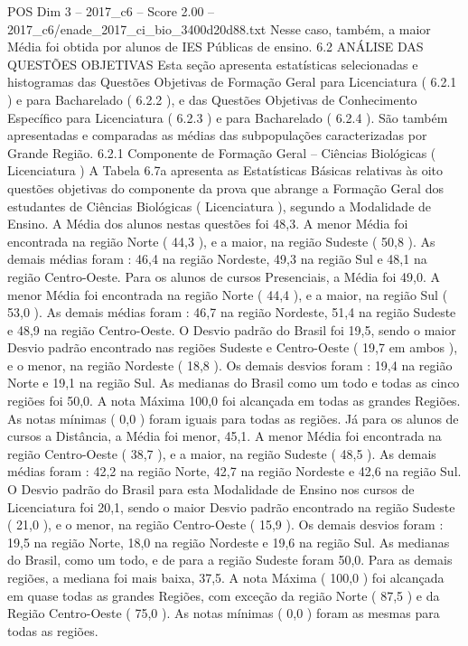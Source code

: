 \begin{textsample}{POS Dim 3 – 2017\_c6 – Score 2.00 – 2017\_c6/enade\_2017\_ci\_bio\_3400d20d88.txt}
Nesse caso, também, a maior Média foi obtida por alunos de IES Públicas de ensino. 6.2 ANÁLISE DAS QUESTÕES OBJETIVAS Esta seção apresenta estatísticas selecionadas e histogramas das Questões Objetivas de Formação Geral para Licenciatura ( 6.2.1 ) e para Bacharelado ( 6.2.2 ), e das Questões Objetivas de Conhecimento Específico para Licenciatura ( 6.2.3 ) e para Bacharelado ( 6.2.4 ).
São também apresentadas e comparadas as médias das subpopulações caracterizadas por Grande Região. 6.2.1 Componente de Formação Geral – Ciências Biológicas ( Licenciatura ) A Tabela 6.7a apresenta as Estatísticas Básicas relativas às oito questões objetivas do componente da prova que abrange a Formação Geral dos estudantes de Ciências Biológicas ( Licenciatura ), segundo a Modalidade de Ensino.
A Média dos alunos nestas questões foi 48,3.
A menor Média foi encontrada na região Norte ( 44,3 ), e a maior, na região Sudeste ( 50,8 ).
As demais médias foram : 46,4 na região Nordeste, 49,3 na região Sul e 48,1 na região Centro-Oeste.
Para os alunos de cursos Presenciais, a Média foi 49,0.
A menor Média foi encontrada na região Norte ( 44,4 ), e a maior, na região Sul ( 53,0 ).
As demais médias foram : 46,7 na região Nordeste, 51,4 na região Sudeste e 48,9 na região Centro-Oeste.
O Desvio padrão do Brasil foi 19,5, sendo o maior Desvio padrão encontrado nas regiões Sudeste e Centro-Oeste ( 19,7 em ambos ), e o menor, na região Nordeste ( 18,8 ).
Os demais desvios foram : 19,4 na região Norte e 19,1 na região Sul.
As medianas do Brasil como um todo e todas as cinco regiões foi 50,0.
A nota Máxima 100,0 foi alcançada em todas as grandes Regiões.
As notas mínimas ( 0,0 ) foram iguais para todas as regiões.
Já para os alunos de cursos a Distância, a Média foi menor, 45,1.
A menor Média foi encontrada na região Centro-Oeste ( 38,7 ), e a maior, na região Sudeste ( 48,5 ).
As demais médias foram : 42,2 na região Norte, 42,7 na região Nordeste e 42,6 na região Sul.
O Desvio padrão do Brasil para esta Modalidade de Ensino nos cursos de Licenciatura foi 20,1, sendo o maior Desvio padrão encontrado na região Sudeste ( 21,0 ), e o menor, na região Centro-Oeste ( 15,9 ).
Os demais desvios foram : 19,5 na região Norte, 18,0 na região Nordeste e 19,6 na região Sul.
As medianas do Brasil, como um todo, e de para a região Sudeste foram 50,0.
Para as demais regiões, a mediana foi mais baixa, 37,5.
A nota Máxima ( 100,0 ) foi alcançada em quase todas as grandes Regiões, com exceção da região Norte ( 87,5 ) e da Região Centro-Oeste ( 75,0 ).
As notas mínimas ( 0,0 ) foram as mesmas para todas as regiões.

\end{textsample}
